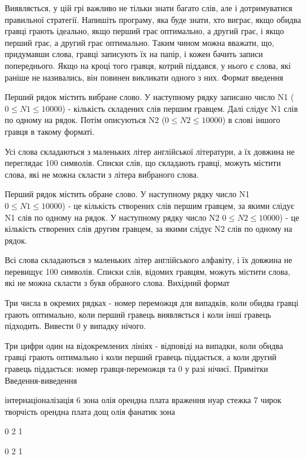 \documentclass[]{article}
\begin{document}
\begin{enumerate}
Виявляється, у цій грі важливо не тільки знати багато слів, але і дотримуватися правильної стратегії. Напишіть програму, яка буде знати, хто виграє, якщо обидва гравці грають ідеально, якщо перший грає оптимально, а другий грає, і якщо перший грає, а другий грає оптимально. Таким чином можна вважати, що, придумавши слова, гравці записують їх на папір, і кожен бачить записи попереднього. Якщо на кроці того гравця, котрий піддався, у нього є слова, які раніше не називались, він повинен викликати одного з них.
Формат введення

Перший рядок містить вибране слово. У наступному рядку записано число N1 ($0 \le N1 \le 10000$) - кількість складених слів першим гравцем. Далі слідує N1 слів по одному на рядок. Потім описуються N2 ($0 \le N2 \le 10000$) в слові іншого гравця в такому форматі.

Усі слова складаються з маленьких літер англійської літератури, а їх довжина не переглядає 100 символів. Списки слів, що складають гравці, можуть містити слова, які не можна скласти з літера вибраного слова.

Перший рядок містить обране слово. У наступному рядку число N1 $0 \le N1 \le 10000$) - це кількість створених слів першим гравцем, за якими слідує N1 слів по одному на рядок. У наступному рядку число N2 $0 \le N2 \le 10000$) - це кількість створених слів другим гравцем, за якими слідує N2 слів по одному на рядок.

Всі слова складаються з маленьких літер англійського алфавіту, і їх довжина не перевищує 100 символів. Списки слів, відомих гравцям, можуть містити слова, які не можна скласти з букв обраного слова.
Вихідний формат

Три числа в окремих рядках - номер переможця для випадків, коли обидва гравці грають оптимально, коли перший гравець виявляється і коли інші гравець підходить. Вивести 0 у випадку нічого.

Три цифри один на відокремлених лініях - відповіді на випадки, коли обидва гравці грають оптимально і коли перший гравець піддається, а коли другий гравець піддається: номер гравця-переможця та 0 у разі нічиєї.
Примітки
Введення-виведення

інтернаціоналізація
6
зона
олія
орендна плата
враження
нуар
стежка
7
чирок
творчість
орендна плата
дощ
олія
фанатик
зона



0
2
1




0
2
1




\end{enumerate}
\end{document}
